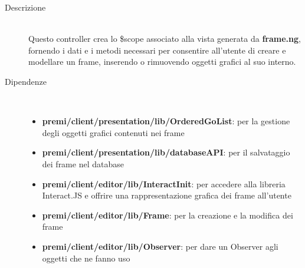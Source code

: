 \begin{description}
\item[Descrizione] \hfill \\
	Questo controller crea lo \$scope associato alla vista generata da \textbf{frame.ng}, fornendo i dati e i metodi necessari per consentire all'utente di creare e modellare un frame, inserendo o rimuovendo oggetti grafici al suo interno.
	
	
\item[Dipendenze] \hfill \\
	\begin{itemize}
		\item \textbf{premi/client/presentation/lib/OrderedGoList}: per la gestione degli oggetti grafici contenuti nei frame
		\item \textbf{premi/client/presentation/lib/databaseAPI}: per il salvataggio dei frame nel database
		\item \textbf{premi/client/editor/lib/InteractInit}: per accedere alla libreria Interact.JS e offrire una rappresentazione grafica dei frame all'utente
		\item \textbf{premi/client/editor/lib/Frame}: per la creazione e la modifica dei frame
		\item \textbf{premi/client/editor/lib/Observer}: per dare un Observer agli oggetti che ne fanno uso
	\end{itemize}
	

\end{description}

